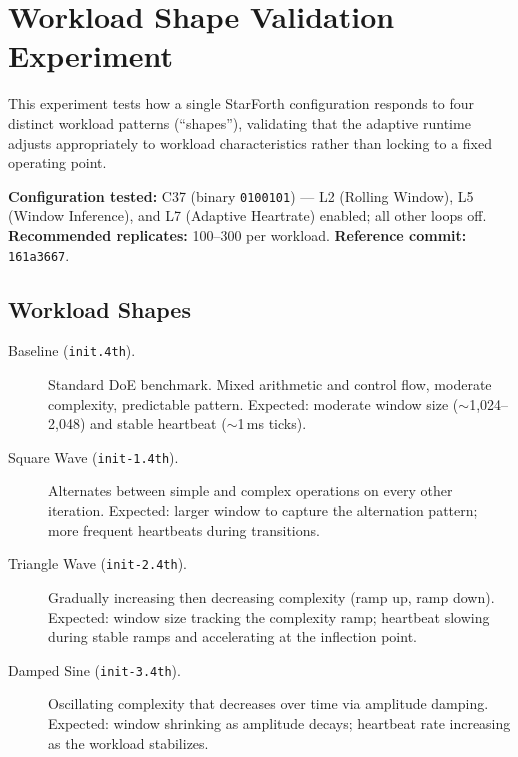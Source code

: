 
\section{Workload Shape Validation Experiment}

This experiment tests how a single StarForth configuration responds to
four distinct workload patterns (``shapes''), validating that the adaptive
runtime adjusts appropriately to workload characteristics rather than
locking to a fixed operating point.

\textbf{Configuration tested:} C37 (binary \texttt{0100101}) — L2
(Rolling Window), L5 (Window Inference), and L7 (Adaptive Heartrate)
enabled; all other loops off.
\textbf{Recommended replicates:} 100--300 per workload.
\textbf{Reference commit:} \texttt{161a3667}.

\subsection{Workload Shapes}

\begin{description}
  \item[Baseline (\texttt{init.4th}).]
        Standard DoE benchmark. Mixed arithmetic and control flow, moderate
        complexity, predictable pattern. Expected: moderate window size
        ($\sim$1{,}024--2{,}048) and stable heartbeat ($\sim$1\,ms ticks).

  \item[Square Wave (\texttt{init-1.4th}).]
        Alternates between simple and complex operations on every other
        iteration. Expected: larger window to capture the alternation
        pattern; more frequent heartbeats during transitions.

  \item[Triangle Wave (\texttt{init-2.4th}).]
        Gradually increasing then decreasing complexity (ramp up, ramp
        down). Expected: window size tracking the complexity ramp; heartbeat
        slowing during stable ramps and accelerating at the inflection point.

  \item[Damped Sine (\texttt{init-3.4th}).]
        Oscillating complexity that decreases over time via amplitude
        damping. Expected: window shrinking as amplitude decays; heartbeat
        rate increasing as the workload stabilizes.
\end{description}

